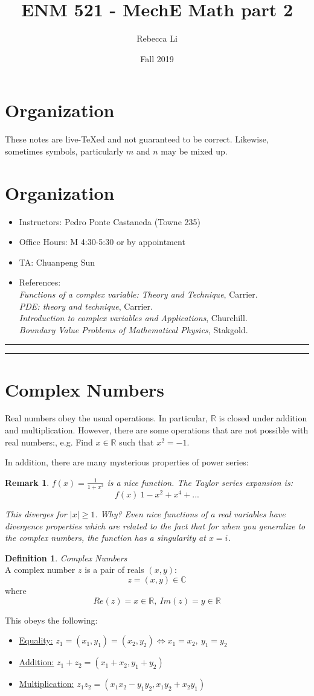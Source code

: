 \documentclass{article}
\title{ENM 521 - MechE Math part 2}
\author{Rebecca Li}
\date{Fall 2019}
\newtheorem*{remark}{Remark}
\theoremstyle{definition}
\newtheorem{definition}{Definition}[section]
\newcommand{\Section}[1]{\hrule\hrule\section{#1}}
\newcommand{\Def}[2]{
\begin{shaded*}
\begin{definition}{\textit{#1}}\\#2\end{definition}
\end{shaded*}
}
\def\R{\mathbb{R}}
\def\C{\mathbb{C}}
\begin{document}
	\maketitle
	\tableofcontents

\section*{Organization}
These notes are live-TeXed and not guaranteed to be correct. Likewise, sometimes symbols, particularly $m$ and $n$ may be mixed up.
	
\section*{Organization}
\begin{itemize}
	\item Instructors: Pedro Ponte Castaneda  (Towne 235)
	\item Office Hours: M 4:30-5:30 or by appointment 
	\item TA: Chuanpeng Sun
	\item References: 
	\\\textit{Functions of a complex variable: Theory and Technique}, Carrier. 
	\\\textit{PDE: theory and technique}, Carrier. 
	\\\textit{Introduction to complex variables and Applications}, Churchill. 
	\\\textit{Boundary Value Problems of Mathematical Physics}, Stakgold.
	

\end{itemize}
\Section{Complex Numbers}
Real numbers obey the usual operations. In particular, $\R$ is closed under addition and multiplication. However, there are some operations that are not possible with real numbers:, e.g. Find $x \in \R$ such that $x^2 = -1$.


In addition, there are many mysterious properties of power series:

\begin{remark}
$f(x) = \frac{1}{1+x^2}$ is a nice function. The Taylor series expansion is:
	$$f(x) ~ 1-x^2+x^4+...$$
	
	This diverges for $|x| \geq 1$. Why?
	Even nice functions of a real variables have divergence properties which are related to the fact that for when you generalize to the complex numbers, the function has a singularity at $x=i$.
\end{remark}

\Def{Complex Numbers}{A complex number $z$ is a pair of reals $(x,y):$
$$z = (x,y) \in \C$$
where
$$Re(z) = x \in \R,\ Im(z) = y \in \R$$

This obeys the following:
\begin{itemize}
	\item \underline{Equality:} $z_1 = (x_1, y_1) = (x_2, y_2) \iff x_1 = x_2,\ y_1 = y_2$
	\item \underline{Addition:} $z_1 + z_2 = (x_1 + x_2, y_1+y_2)$
	\item \underline{Multiplication:} $z_1 z_2 = (x_1 x_2 - y_1 y_2, x_1 y_2 + x_2 y_1)$
\end{itemize}
}
\end{document}
